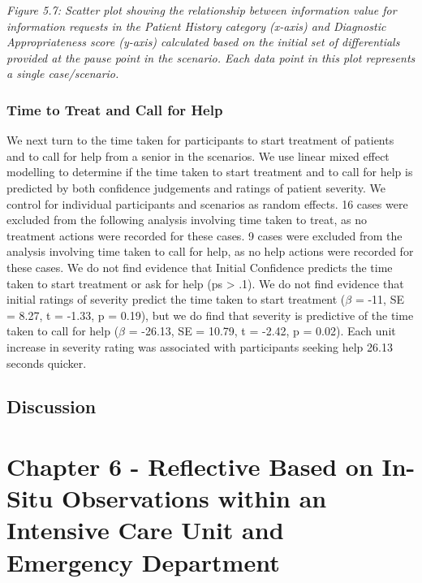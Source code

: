 \documentclass[a4paper, nobind]{templates/ociamthesis}
\begin{document}
\emph{Figure 5.7: Scatter plot showing the relationship between information value for information requests in the Patient History category (x-axis) and Diagnostic Appropriateness score (y-axis) calculated based on the initial set of differentials provided at the pause point in the scenario. Each data point in this plot represents a single case/scenario.}

\subsection*{Time to Treat and Call for Help}\label{time-to-treat-and-call-for-help}

We next turn to the time taken for participants to start treatment of patients and to call for help from a senior in the scenarios. We use linear mixed effect modelling to determine if the time taken to start treatment and to call for help is predicted by both confidence judgements and ratings of patient severity. We control for individual participants and scenarios as random effects. 16 cases were excluded from the following analysis involving time taken to treat, as no treatment actions were recorded for these cases. 9 cases were excluded from the analysis involving time taken to call for help, as no help actions were recorded for these cases. We do not find evidence that Initial Confidence predicts the time taken to start treatment or ask for help (ps \textgreater{} .1). We do not find evidence that initial ratings of severity predict the time taken to start treatment (\(\beta\) = -11, SE = 8.27, t = -1.33, p = 0.19), but we do find that severity is predictive of the time taken to call for help (\(\beta\) = -26.13, SE = 10.79, t = -2.42, p = 0.02). Each unit increase in severity rating was associated with participants seeking help 26.13 seconds quicker.

\section*{Discussion}\label{discussion-3}

\chapter*{Chapter 6 - Reflective Based on In-Situ Observations within an Intensive Care Unit and Emergency Department}\label{chapter-6---reflective-based-on-in-situ-observations-within-an-intensive-care-unit-and-emergency-department}
\end{document}
